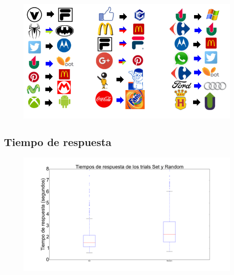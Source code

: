 \documentclass{beamer}
\begin{document}
\begin{frame}
\begin{figure}[h]
 \centering
  \begin{minipage}[c]{1\textwidth}
	\centering	
	\includegraphics[scale=0.5]{randoms.png}
  \end{minipage}
\end{figure}
\end{frame}

\subsection{Tiempo de respuesta}

\begin{frame}
\begin{figure}[h]
 \centering
  \begin{minipage}[c]{1\textwidth}
	\centering	
	\includegraphics[scale=0.22]{rt.png}
  \end{minipage}
\end{figure}
\end{frame}
\end{document}
